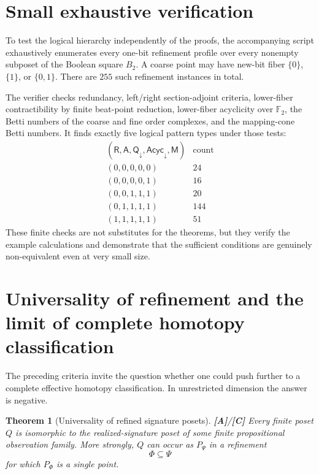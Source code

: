 \documentclass[11pt]{article}
\newtheorem{theorem}{Theorem}[section]
\theoremstyle{definition}
\newcommand{\F}{\mathbb F_2}
\newcommand{\statusA}{\textbf{[A]}}
\newcommand{\statusC}{\textbf{[C]}}
\begin{document}
\section{Small exhaustive verification}

To test the logical hierarchy independently of the proofs, the accompanying script exhaustively enumerates every one-bit refinement profile over every nonempty subposet of the Boolean square \(B_2\). A coarse point may have new-bit fiber \(\{0\}\), \(\{1\}\), or \(\{0,1\}\). There are \(255\) such refinement instances in total.

The verifier checks redundancy, left/right section-adjoint criteria, lower-fiber contractibility by finite beat-point reduction, lower-fiber acyclicity over \(\F\), the Betti numbers of the coarse and fine order complexes, and the mapping-cone Betti numbers. It finds exactly five logical pattern types under those tests:
\[
\begin{array}{c|r}
(\mathsf R,\mathsf A,\mathsf Q_{\downarrow},\mathsf{Acyc}_{\downarrow},\mathsf M)&\text{count}\\\hline
(0,0,0,0,0)&24\\
(0,0,0,0,1)&16\\
(0,0,1,1,1)&20\\
(0,1,1,1,1)&144\\
(1,1,1,1,1)&51
\end{array}
\]
These finite checks are not substitutes for the theorems, but they verify the example calculations and demonstrate that the sufficient conditions are genuinely non-equivalent even at very small size.

\section{Universality of refinement and the limit of complete homotopy classification}\label{sec:universality}

The preceding criteria invite the question whether one could push further to a complete effective homotopy classification. In unrestricted dimension the answer is negative.

\begin{theorem}[Universality of refined signature posets]\label{thm:universality}
\statusA/\statusC\;
Every finite poset \(Q\) is isomorphic to the realized-signature poset of some finite propositional observation family. More strongly, \(Q\) can occur as \(P_\Psi\) in a refinement
\[
\Phi\subseteq\Psi
\]
for which \(P_\Phi\) is a single point.
\end{theorem}
\end{document}
